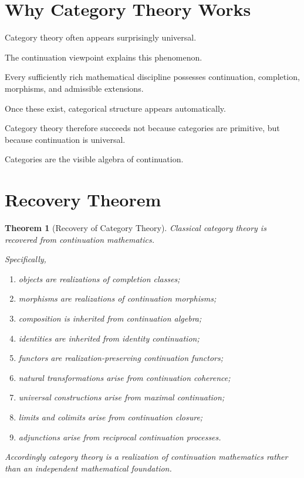 \documentclass[13pt,openany]{book}
\theoremstyle{plain}
\newtheorem{theorem}{Theorem}[chapter]
\theoremstyle{definition}
\begin{document}
\section{Why Category Theory Works}

Category theory often appears surprisingly universal.

The continuation viewpoint explains this phenomenon.

Every sufficiently rich mathematical discipline possesses continuation,
completion, morphisms, and admissible extensions.

Once these exist, categorical structure appears automatically.

Category theory therefore succeeds not because categories are primitive, but
because continuation is universal.

Categories are the visible algebra of continuation.

\section{Recovery Theorem}

\begin{theorem}[Recovery of Category Theory]
Classical category theory is recovered from continuation mathematics.

Specifically,

\begin{enumerate}

\item objects are realizations of completion classes;

\item morphisms are realizations of continuation morphisms;

\item composition is inherited from continuation algebra;

\item identities are inherited from identity continuation;

\item functors are realization-preserving continuation functors;

\item natural transformations arise from continuation coherence;

\item universal constructions arise from maximal continuation;

\item limits and colimits arise from continuation closure;

\item adjunctions arise from reciprocal continuation processes.

\end{enumerate}

Accordingly category theory is a realization of continuation mathematics rather
than an independent mathematical foundation.
\end{theorem}
\end{document}
